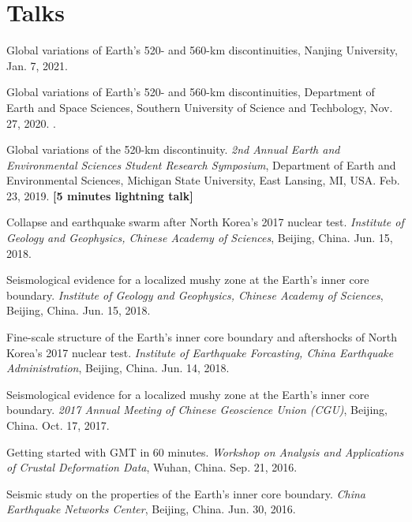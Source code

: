 \section*{Talks}
\begin{etaremune}
\item
	Global variations of Earth's 520- and 560-km discontinuities,
	Nanjing University,
	Jan. 7, 2021.
\item
	Global variations of Earth's 520- and 560-km discontinuities,
	Department of Earth and Space Sciences, Southern University of Science and Techbology,
	Nov. 27, 2020.
	\invited.
\item
    Global variations of the 520-km discontinuity.
    \textit{ 2nd Annual Earth and Environmental Sciences Student Research Symposium},
    Department of Earth and Environmental Sciences, Michigan State University, East Lansing, MI, USA.
    Feb. 23, 2019.
    \textbf{[5 minutes lightning talk]}
\item
    Collapse and earthquake swarm after North Korea's 2017 nuclear test.
    \textit{Institute of Geology and Geophysics, Chinese Academy of Sciences}, Beijing, China.
    Jun. 15, 2018.
\item
    Seismological evidence for a localized mushy zone at the Earth's inner core boundary.
    \textit{Institute of Geology and Geophysics, Chinese Academy of Sciences}, Beijing, China.
    Jun. 15, 2018.
    \invited
\item
    Fine-scale structure of the Earth's inner core boundary and aftershocks of North Korea's 2017 nuclear test.
    \textit{Institute of Earthquake Forcasting, China Earthquake Administration}, Beijing, China.
    Jun. 14, 2018.
\item
    Seismological evidence for a localized mushy zone at the Earth's inner core boundary.
    \textit{2017 Annual Meeting of Chinese Geoscience Union (CGU)}, Beijing, China.
    Oct. 17, 2017.
    \invited
\item
    Getting started with GMT in 60 minutes.
    \textit{Workshop on Analysis and Applications of Crustal Deformation Data}, Wuhan, China.
    Sep. 21, 2016.
    \invited
\item
    Seismic study on the properties of the Earth's inner core boundary.
    \textit{China Earthquake Networks Center}, Beijing, China.
    Jun. 30, 2016.
    \invited
\end{etaremune}
